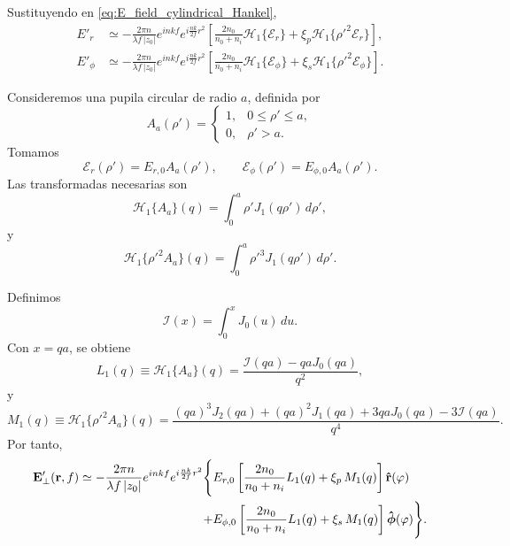 Sustituyendo en \eqref{eq:E_field_cylindrical_Hankel},
\begin{equation}
\begin{aligned}
E'_r
&\simeq
-\frac{2\pi n}{\lambda f\,|z_0|}
e^{inkf}
e^{i\frac{nk}{2f}r^2}
\left[
\frac{2n_0}{n_0+n_i}\mathscr H_1\{\mathscr E_r\}
+
\xi_p
\mathscr H_1\{\rho'^2\mathscr E_r\}
\right],
\\
E'_\phi
&\simeq
-\frac{2\pi n}{\lambda f\,|z_0|}
e^{inkf}
e^{i\frac{nk}{2f}r^2}
\left[
\frac{2n_0}{n_0+n_i}\mathscr H_1\{\mathscr E_\phi\}
+
\xi_s
\mathscr H_1\{\rho'^2\mathscr E_\phi\}
\right].
\end{aligned}
\label{eq:E_cylindrical_paraxial}
\end{equation}

Consideremos una pupila circular de radio \(a\), definida por
\begin{equation}
  A_a(\rho')
  =
  \begin{cases}
  1, & 0\leq \rho'\leq a,\\
  0, & \rho'>a.
  \end{cases}
\end{equation}
Tomamos
\begin{equation}
  \mathscr E_r(\rho')=E_{r,0}A_a(\rho'),
  \qquad
  \mathscr E_\phi(\rho')=E_{\phi,0}A_a(\rho').
\end{equation}
Las transformadas necesarias son
\begin{equation}
  \mathscr H_1\{A_a\}(q)
  =
  \int_0^a
  \rho'J_1(q\rho')\,d\rho',
\end{equation}
y
\begin{equation}
  \mathscr H_1\{\rho'^2A_a\}(q)
  =
  \int_0^a
  \rho'^3J_1(q\rho')\,d\rho'.
\end{equation}

Definimos
\begin{equation}
  \mathcal I(x)
  =
  \int_0^x J_0(u)\,du.
  \label{eq:Lommel_I_def_cylindrical}
\end{equation}
Con \(x=qa\), se obtiene
\begin{equation}
  L_1(q)
  \equiv
  \mathscr H_1\{A_a\}(q)
  =
  \frac{\mathcal I(qa)-qaJ_0(qa)}{q^2},
  \label{eq:L1_def_cylindrical}
\end{equation}
y
\begin{equation}
  M_1(q)
  \equiv
  \mathscr H_1\{\rho'^2A_a\}(q)
  =
  \frac{
  (qa)^3J_2(qa)
  +
  (qa)^2J_1(qa)
  +
  3qaJ_0(qa)
  -
  3\mathcal I(qa)
  }{q^4}.
  \label{eq:M1_def_cylindrical}
\end{equation}
Por tanto,
\begin{equation}
\begin{aligned}
\vb E'_\perp(\vb r,f)
\simeq
-\frac{2\pi n}{\lambda f\,|z_0|}
e^{inkf}
e^{i\frac{nk}{2f}r^2}
\Bigg\{
&
E_{r,0}
\left[
\frac{2n_0}{n_0+n_i}L_1(q)
+
\xi_p\,M_1(q)
\right]\bm{\hat{\mathbf{r}}}(\varphi)
\\
+
&
E_{\phi,0}
\left[
\frac{2n_0}{n_0+n_i}L_1(q)
+
\xi_s\,M_1(q)
\right]\bm{\hat{\mathbf{\phi}}}(\varphi)
\Bigg\}.
\end{aligned}
\label{eq:E_cylindrical_homogeneous}
\end{equation}

